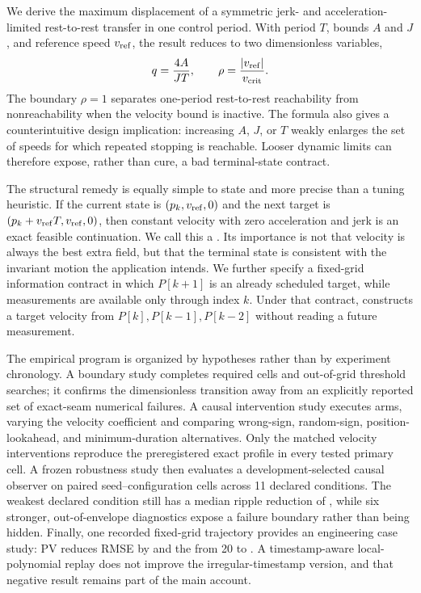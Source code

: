 We derive the maximum displacement of a symmetric jerk- and acceleration-limited rest-to-rest transfer in one control period. With period $T$, bounds $A$ and $J$, and reference speed $v_{\mathrm{ref}}$, the result reduces to two dimensionless variables,
\begin{equation}
 q=\frac{4A}{JT}, \qquad
 \rho=\frac{\lvert v_{\mathrm{ref}}\rvert}{v_{\mathrm{crit}}}.
 \label{eq:intro-dimensionless}
\end{equation}
The boundary $\rho=1$ separates one-period rest-to-rest reachability from nonreachability when the velocity bound is inactive. The formula also gives a counterintuitive design implication: increasing $A$, $J$, or $T$ weakly enlarges the set of speeds for which repeated stopping is reachable. Looser dynamic limits can therefore expose, rather than cure, a bad terminal-state contract.

The structural remedy is equally simple to state and more precise than a tuning heuristic. If the current state is $(p_k,v_{\mathrm{ref}},0)$ and the next target is $(p_k+v_{\mathrm{ref}} T,v_{\mathrm{ref}},0)$, then constant velocity with zero acceleration and jerk is an exact feasible continuation. We call this a \matchedvelocity. Its importance is not that velocity is always the best extra field, but that the terminal state is consistent with the invariant motion the application intends. We further specify a fixed-grid information contract in which $P[k+1]$ is an already scheduled target, while measurements are available only through index $k$. Under that contract, \FutureOOne{} constructs a target velocity from $P[k],P[k-1],P[k-2]$ without reading a future measurement.

The empirical program is organized by hypotheses rather than by experiment chronology. A boundary study completes \EFifteenGridCount{} required cells and \EFifteenSobolCount{} out-of-grid threshold searches; it confirms the dimensionless transition away from an explicitly reported set of \EFifteenSeamCount{} exact-seam numerical failures. A causal intervention study executes \ESixteenArmCount{} arms, varying the velocity coefficient and comparing wrong-sign, random-sign, position-lookahead, and minimum-duration alternatives. Only the matched velocity interventions reproduce the preregistered exact profile in every tested primary cell. A frozen robustness study then evaluates a development-selected causal observer on \ESeventeenWorkPairCount{} paired seed--configuration cells across 11 declared conditions. The weakest declared condition still has a median ripple reduction of \ESeventeenWeakMedianPercent, while six stronger, out-of-envelope diagnostics expose a failure boundary rather than being hidden. Finally, one recorded fixed-grid trajectory provides an engineering case study: PV \FutureOOne{} reduces RMSE by \RecordedPVReductionPercent{} and the \observedlag{} from 20 to \RecordedPVLag. A timestamp-aware local-polynomial replay does not improve the irregular-timestamp version, and that negative result remains part of the main account.

